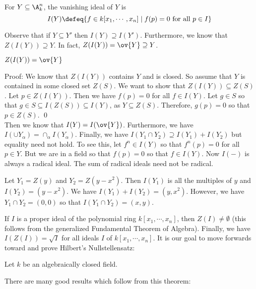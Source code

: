 \begin{dfn}
For $Y \subseteq \A_k^n$, the vanishing ideal of $Y$ is
\[
I(Y) \defeq \{ f \in k[x_1,\cdots,x_n] \;|\; f(p)=0 \text{ for all } p \in I \}
\]
\end{dfn}

Observe that if $Y \subseteq Y'$ then $I(Y) \supseteq I(Y')$. Furthermore, we know that $Z(I(Y)) \supseteq Y$. In fact, $Z(I(Y))= \ov{Y} \supseteq Y$. 

\begin{lem}
$Z(I(Y))=\ov{Y}$
\end{lem}

\noindent Proof: We know that $Z(I(Y))$ contains $Y$ and is closed. So assume that $Y$ is contained in some closed set $Z(S)$. We want to show that $Z(I(Y)) \subseteq Z(S)$. Let $p \in Z(I(Y))$. Then we have $f(p)=0$ for all $f \in I(Y)$. Let $g \in S$ so that $g \in S \subseteq I(Z(S)) \subseteq I(Y)$, as $Y \subseteq Z(S)$. Therefore, $g(p)=0$ so that $p \in Z(S)$. \qed \\

Then we know that $I(Y)=I(\ov{Y})$. Furthermore, we have $I(\cup Y_\alpha)=\cap_\alpha I(Y_\alpha)$. Finally, we have $I(Y_1 \cap Y_2) \supseteq I(Y_1)+I(Y_2)$ but equality need not hold. To see this, let $f^n \in I(Y)$ so that $f^n(p)=0$ for all $p \in Y$. But we are in a field so that $f(p)=0$ so that $f \in I(Y)$. Now $I(-)$ is always a radical ideal. The sum of radical ideals need not be radical. 

\begin{ex}
Let $Y_1=Z(y)$ and $Y_2=Z(y-x^2)$. Then $I(Y_1)$ is all the multiples of $y$ and $I(Y_2)=(y-x^2)$. We have $I(Y_1)+I(Y_2)=(y,x^2)$. However, we have $Y_1 \cap Y_2=(0,0)$ so that $I(Y_1 \cap Y_2)=(x,y)$. 
\end{ex}

If $I$ is a proper ideal of the polynomial ring $k[x_1,\cdots,x_n]$, then $Z(I) \neq \emptyset$ (this follows from the generalized Fundamental Theorem of Algebra). Finally, we have $I(Z(I))=\sqrt{I}$ for all ideals $I$ of $k[x_1,\cdots,x_n]$. It is our goal to move forwards toward and prove Hilbert's Nullstellensatz: 

\begin{thmm}
Let $k$ be an algebraically closed field. 
\end{thmm}

There are many good results which follow from this theorem:

